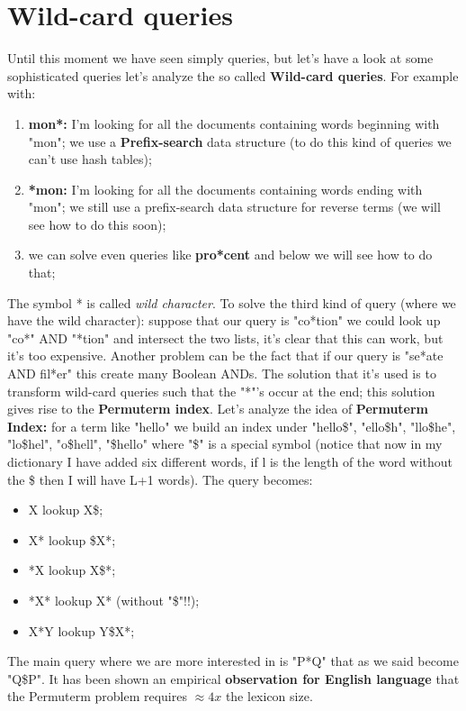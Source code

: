 \section{Wild-card queries}
Until this moment we have seen simply queries, but let's have a look at some sophisticated queries let's analyze the so called \textbf{Wild-card queries}.
For example with:
\begin{enumerate}
    \item \textbf{mon*:} I'm looking for all the documents containing words beginning with "mon"; we use a \textbf{Prefix-search} data structure (to do this kind of queries we can't use hash tables);
    \item \textbf{*mon:} I'm looking for all the documents containing words ending with "mon"; we still use a prefix-search data structure for reverse terms (we will see how to do this soon);
    \item we can solve even queries like \textbf{pro*cent} and below we will see how to do that;
\end{enumerate}
The symbol * is called \textit{wild character}.\newline
To solve the third kind of query (where we have the wild character): suppose that our query is "co*tion" we could look up "co*" AND "*tion" and intersect the two lists, it's clear that this can work, but it's too expensive. Another problem can be the fact that if our query is "se*ate AND fil*er" this create many Boolean ANDs.\newline
The solution that it's used is to transform wild-card queries such that the "*"'s occur at the end; this solution gives rise to the \textbf{Permuterm index}.
Let's analyze the idea of \textbf{Permuterm Index:} for a term like "hello" we build an index under "hello\$", "ello\$h", "llo\$he", "lo\$hel", "o\$hell", "\$hello" where "\$" is a special symbol (notice that now in my dictionary I have added six different words, if l is the length of the word without the \$ then I will have L+1 words).
The query becomes:
\begin{itemize}
    \item X lookup X\$;
    \item X* lookup \$X*;
    \item *X lookup X\$*;
    \item *X* lookup X* (without "\$"!!);
    \item X*Y lookup Y\$X*;
\end{itemize}
The main query where we are more interested in is "P*Q" that as we said become "Q\$P". It has been shown an empirical \textbf{observation for English language} that the Permuterm problem requires $\approx 4x$ the lexicon size.\newline
